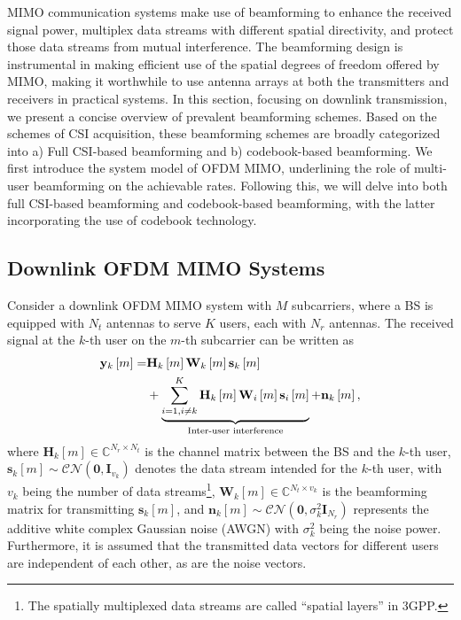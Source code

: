 \documentclass[lettersize,journal]{IEEEtran}
\begin{document}
MIMO communication systems make use of beamforming to enhance the received signal power, multiplex data streams with different spatial directivity, and protect those data streams from mutual interference. The beamforming design is instrumental in making efficient use of the spatial degrees of freedom offered by MIMO, making it worthwhile to use antenna arrays at both the transmitters and receivers in practical systems.
 In this section, focusing on downlink transmission, we present a concise overview of prevalent beamforming schemes. Based on the schemes of CSI acquisition, these beamforming schemes are broadly categorized into a) Full CSI-based beamforming and b) codebook-based beamforming. We first introduce the system model of OFDM MIMO, underlining the role of multi-user beamforming on the achievable rates. Following this, we will delve into both full CSI-based beamforming and codebook-based beamforming, with the latter incorporating the use of codebook technology.

\subsection{Downlink OFDM  MIMO Systems}
Consider a downlink OFDM MIMO system with $M$ subcarriers, where a BS is equipped with $N_t$ antennas to serve $K$ users, each with $N_r$ antennas. The received signal at the $k$-th user on the $m$-th subcarrier can be written as
\begin{align}\label{mu-re-sig}
\mathbf{y}_k\left[m\right] = & \mathbf{H}_k\left[m\right] \mathbf{W}_k\left[m\right] \mathbf{s}_k\left[m\right] \notag \\
& + \underbrace{\sum_{i=1, i \neq k}^K \mathbf{H}_k\left[m\right] \mathbf{W}_i\left[m\right] \mathbf{s}_i\left[m\right]}_{\text{Inter-user interference}} + \mathbf{n}_k\left[m\right],
\end{align}
where $\mathbf{H}_k[m] \in \mathbb{C}^{N_r \times N_t}$ is the channel matrix between the BS and the $k$-th user, ${\mathbf{s}}_k[m] \sim \mathcal{CN}(\mathbf{0}, \mathbf{I}_{v_k})$ denotes the data stream intended for the $k$-th user, with $v_k$ being the number of data streams\footnote{The spatially multiplexed data streams are called ``spatial layers'' in 3GPP.}, $\mathbf{W}_k[m] \in \mathbb{C}^{N_t \times v_k}$ is the beamforming matrix for transmitting ${\mathbf{s}}_k[m]$, and $\mathbf{n}_k[m] \sim \mathcal{CN}(\mathbf{0}, \sigma_k^2 \mathbf{I}_{N_r})$ represents the additive white complex Gaussian noise (AWGN) with $\sigma_k^2$ being the noise power. Furthermore, it is assumed that the transmitted data vectors for different users are independent of each other, as are the noise vectors.
\end{document}
